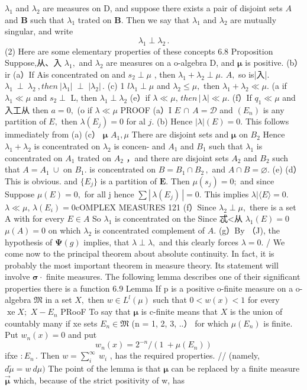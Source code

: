 $\lambda_{1}$ and $\lambda_{2}$ are measures on D, and suppose there exists a pair of disjoint sets $\scriptstyle A$ and $\boldsymbol{B}$ such that $\lambda_{1}$ trated on ${\boldsymbol{B}}.$ Then we say that $\lambda_{1}$ and $\lambda_{2}$ are mutually singular, and write $$ \lambda_{1}\perp\lambda_{2}\,. $$ (2) Here are some elementary properties of these concepts 6.8 Proposition Suppose,从、入 $\lambda_{1},$ and $\lambda_{2}$ are measures on a o-algebra D, and ${\boldsymbol{\mu}}$ is positive. (b）ir (a）If Ais concentrated on and $s_{2}\perp\mu$ , then $\lambda_{1}+\lambda_{2}\perp\mu.$ $A,$ so is|入|. $\lambda_{1}\:\perp\ \lambda_{2}\:,t h e n\:|\lambda_{1}|\;\perp\;|\lambda_{2}|\,.$ (c) 1 $\textstyle l\lambda_{1}\perp\mu$ and $\lambda_{2}\leqslant\mu,$ then $\lambda_{1}+\lambda_{2}\ll\mu.$ (a if $\lambda_{1}\ll\mu$ and $s_{2}\perp$ L, then $\lambda_{1}\perp\lambda_{2}$ (e）if $\lambda\ll\mu,\,t h e n\,|\,\lambda|\ll\mu.$ (f）If $q_{1}\ll\mu$ and 入工从 then $\scriptstyle a=0,$ (o if $\lambda\ll\mu$ PROOF (a）I $E\,\cap\,A=\mathcal{D}$ and $(E_{n})$ is any partition of $\textstyle E,$ then $\lambda(E_{j})=0$ for al $j.$ (b) Hence $|\lambda|(E)=0.$ This follows immediately from (a) (c） ${\boldsymbol{\mu}}$ $\scriptstyle{A_{1},\mu}$ There are disjoint sets and ${\boldsymbol{\mu}}$ on $B_{2}$ Hence $\lambda_{1}+\lambda_{2}$ is concentrated on $\lambda_{2}$ is concen- and $A_{1}$ and $B_{1}$ such that $\lambda_{1}$ is concentrated on $A_{1}$ trated on $A_{2}$ ，and there are disjoint sets $A_{2}$ and $B_{2}$ such that $A=A_{1}\ \cup$ on $B_{1}.$ is concentrated on $B=B_{1}\cap B_{2}\,,$ and $A\cap B=\varnothing.$ (e) (d）This is obvious. and $\{E_{j}\}$ is a partition of ${\boldsymbol{E}}.$ Then $\mu(s_{j})=0;$ and since Suppose $\mu(E)=0,$ for all j hence $\sum\left|\,\lambda(E_{j})\,\right|=0.$ This implies $\lambda|\langle E\rangle=0.$ $\lambda\ll\mu,\,\lambda(E_{i})=0$cOMPLEX MEASURES 121 (f）Since $\lambda_{2}\perp\mu,$ there is a set A with for every $\scriptstyle{E\in{A}}$ So $\lambda_{1}$ is concentrated on the Since 忒<从 $\lambda_{1}(E)=0$ $\mu(A)=0$ on which $\lambda_{2}$ is concentrated complement of $A.$ (g）By （J), the hypothesis of $\mathbf{\Psi}(g)$ implies, that $\lambda\perp\lambda,$ and this clearly forces $\lambda=0.$ / We come now to the principal theorem about absolute continuity. In fact, it is probably the most important theorem in measure theory. Its statement will involve ${\boldsymbol{\sigma}}\cdot$ finite measures. The following lemma describes one of their significant properties there is a function 6.9 Lemma If p is a positive o-finite measure on a o-algebra ${\mathfrak{M}}$ in a set $X,$ then $w\in L^{l}(\mu)$ such that $0<w(x)<1$ for every $\operatorname{xe}X;$ $X-E_{n}$ PRooF To say that ${\boldsymbol{\mu}}$ is c-finite means that $X$ is the union of countably many if xe sets $E_{n}\in{\mathfrak{M}}$ (n = 1, 2, 3, ..） for which $\mu(E_{n})$ is finite. Put $w_{n}(x)=0$ and put $$ w_{n}(x)=2^{-n}/(1\ +\mu(E_{n})) $$ ifxe $:E_{n}\,.$ Then $w=\sum_{i}^{\infty}\:w_{i}$ , has the required properties. // (namely, $d{\tilde{\mu}}=w\ d\mu)$ The point of the lemma is that ${\boldsymbol{\mu}}$ can be replaced by a finite measure $\boldsymbol{\vec{\mu}}$ which, because of the strict positivity of w, has 